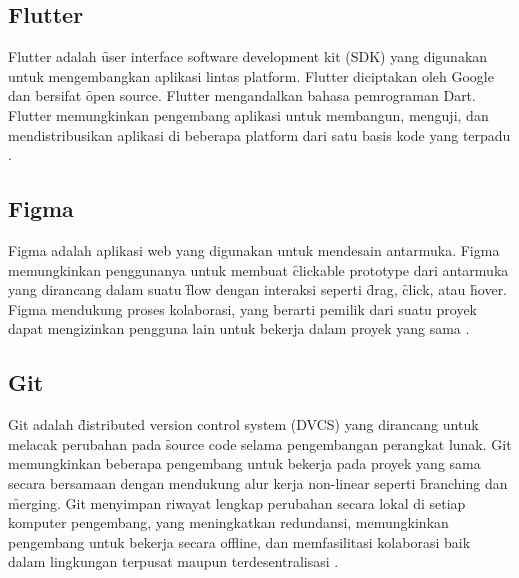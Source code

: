 \subsection{Flutter}
\label{sec:flutter}
Flutter adalah \f{user interface software development kit} (SDK) yang digunakan
untuk mengembangkan aplikasi lintas platform. Flutter diciptakan oleh Google dan
bersifat \f{open source}. Flutter mengandalkan bahasa pemrograman Dart. Flutter
memungkinkan pengembang aplikasi untuk membangun, menguji, dan mendistribusikan
aplikasi di beberapa platform dari satu basis kode yang terpadu \citep{flutter:docs}.

\subsection{Figma}
\label{sec:figma}
Figma adalah aplikasi web yang digunakan untuk mendesain antarmuka. Figma
memungkinkan penggunanya untuk membuat \f{clickable prototype} dari antarmuka
yang dirancang dalam suatu \f{flow} dengan interaksi seperti \f{drag}, \f{click},
atau \f{hover}. Figma mendukung proses kolaborasi, yang berarti pemilik dari
suatu proyek dapat mengizinkan pengguna lain untuk bekerja dalam proyek yang
sama \citep{figma:wired}.

\subsection{Git}
\label{sec:git}
Git adalah \f{distributed version control system} (DVCS) yang dirancang untuk
melacak perubahan pada \f{source code} selama pengembangan perangkat lunak. Git
memungkinkan beberapa pengembang untuk bekerja pada proyek yang sama secara
bersamaan dengan mendukung alur kerja non-linear seperti \f{branching} dan
\f{merging}. Git menyimpan riwayat lengkap perubahan secara lokal di setiap
komputer pengembang, yang meningkatkan redundansi, memungkinkan pengembang untuk
bekerja secara offline, dan memfasilitasi kolaborasi baik dalam lingkungan
terpusat maupun terdesentralisasi \citep{git:progit}.

